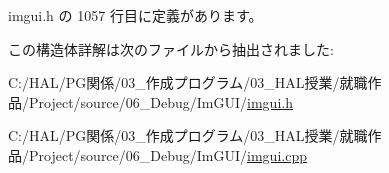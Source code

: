  imgui.\+h の 1057 行目に定義があります。



この構造体詳解は次のファイルから抽出されました\+:\begin{DoxyCompactItemize}
\item 
C\+:/\+H\+A\+L/\+P\+G関係/03\+\_\+作成プログラム/03\+\_\+\+H\+A\+L授業/就職作品/\+Project/source/06\+\_\+\+Debug/\+Im\+G\+U\+I/\mbox{\hyperlink{imgui_8h}{imgui.\+h}}\item 
C\+:/\+H\+A\+L/\+P\+G関係/03\+\_\+作成プログラム/03\+\_\+\+H\+A\+L授業/就職作品/\+Project/source/06\+\_\+\+Debug/\+Im\+G\+U\+I/\mbox{\hyperlink{imgui_8cpp}{imgui.\+cpp}}\end{DoxyCompactItemize}
